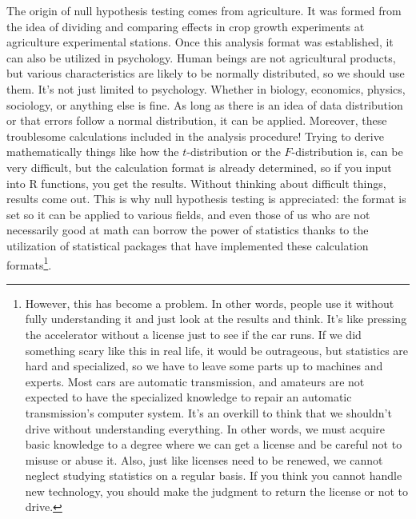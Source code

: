 \documentclass{ltjbook}
\begin{document}
The origin of null hypothesis testing comes from agriculture. It was formed from the idea of dividing and comparing effects in crop growth experiments at agriculture experimental stations. Once this analysis format was established, it can also be utilized in psychology. Human beings are not agricultural products, but various characteristics are likely to be normally distributed, so we should use them. It's not just limited to psychology. Whether in biology, economics, physics, sociology, or anything else is fine. As long as there is an idea of data distribution or that errors follow a normal distribution, it can be applied. Moreover, these troublesome calculations included in the analysis procedure! Trying to derive mathematically things like how the $t$-distribution or the $F$-distribution is, can be very difficult, but the calculation format is already determined, so if you input into R functions, you get the results. Without thinking about difficult things, results come out. This is why null hypothesis testing is appreciated: the format is set so it can be applied to various fields, and even those of us who are not necessarily good at math can borrow the power of statistics thanks to the utilization of statistical packages that have implemented these calculation formats\footnote{However, this has become a problem. In other words, people use it without fully understanding it and just look at the results and think. It's like pressing the accelerator without a license just to see if the car runs. If we did something scary like this in real life, it would be outrageous, but statistics are hard and specialized, so we have to leave some parts up to machines and experts. Most cars are automatic transmission, and amateurs are not expected to have the specialized knowledge to repair an automatic transmission's computer system. It's an overkill to think that we shouldn't drive without understanding everything. In other words, we must acquire basic knowledge to a degree where we can get a license and be careful not to misuse or abuse it. Also, just like licenses need to be renewed, we cannot neglect studying statistics on a regular basis. If you think you cannot handle new technology, you should make the judgment to return the license or not to drive.}.
\end{document}
